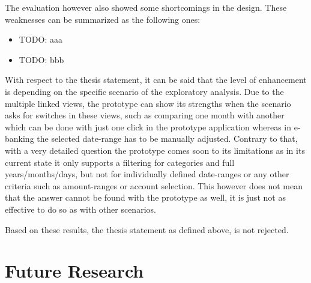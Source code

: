 The evaluation however also showed some shortcomings in the design. These weaknesses can be summarized as the following ones:
\begin{itemize}[]
	\item TODO: aaa
	\item TODO: bbb
\end{itemize}

With respect to the thesis statement, it can be said that the level of enhancement is depending on the specific scenario of the exploratory analysis. Due to the multiple linked views, the prototype can show its strengths when the scenario asks for switches in these views, such as comparing one month with another which can be done with just one click in the prototype application whereas in e-banking the selected date-range has to be manually adjusted. Contrary to that, with a very detailed question the prototype comes soon to its limitations as in its current state it only supports a filtering for categories and full years/months/days, but not for individually defined date-ranges or any other criteria such as amount-ranges or account selection. This however does not mean that the answer cannot be found with the prototype as well, it is just not as effective to do so as with other scenarios.
\begin{framed}
	\textit{\thesisstatementtext}
\end{framed}

Based on these results, the thesis statement as defined above, is not rejected.



\section{Future Research}

